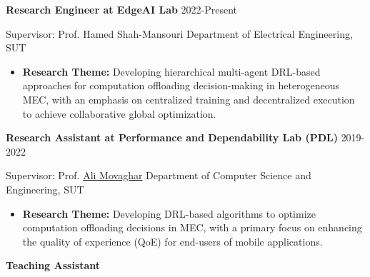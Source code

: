 \documentclass[11pt]{article}
\begin{document}
\large{\textbf{Research Engineer at EdgeAI Lab} } \hfill 2022-Present\vspace{1mm}
\normalsize

	\hspace{-5.5mm}Supervisor: Prof. {Hamed Shah-Mansouri} \href{https://scholar.google.com/citations?user=dcjIFccAAAAJ&hl=en&oi=ao}{\small \faExternalLink} \href{https://scholar.google.com/citations?user=BXNelwwAAAAJ\&hl=en}\hfill Department of Electrical Engineering, SUT
	\begin{itemize}
		\vspace{-2mm}  
		\item\textbf{Research Theme:} Developing hierarchical multi-agent DRL-based approaches for computation offloading decision-making in heterogeneous MEC, with an emphasis on centralized training and decentralized execution to achieve collaborative global optimization.\\ 
	\end{itemize}
\vspace{-5mm}
\large{\textbf{Research Assistant at Performance and Dependability Lab (PDL)} }\hfill 2019-2022\vspace{1mm}

\normalsize
\hspace{-5.5mm}Supervisor: Prof. \href{https://scholar.google.com/citations?user=BXNelwwAAAAJ\&hl=en}{Ali Movaghar} \hfill Department of Computer Science and Engineering, SUT\vspace{-2mm}
\begin{itemize}
	\item\textbf{Research Theme:} Developing DRL-based algorithms to optimize computation offloading decisions in MEC, with a primary focus on enhancing the quality of experience (QoE) for end-users of mobile applications.
\end{itemize}
\large\large\textbf{Teaching Assistant}  \vspace{-2mm}
\normalsize
\end{document}
